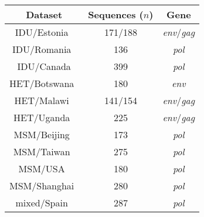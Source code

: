 \begin{tabular}{ccc}
  Dataset & Sequences ($n$) & Gene \\
  \hline
  IDU/Estonia~\autocite{zetterberg2004two} & 171/188 & \textit{env}/\textit{gag} \\
  IDU/Romania~\autocite{niculescu2015recent} & 136 & \textit{pol} \\
  IDU/Canada & 399 & \textit{pol} \\
  HET/Botswana~\autocite{novitsky2013phylogenetic,novitsky2014impact} & 180 & \textit{env} \\
  HET/Malawi~\autocite{mccormack2002early} & 141/154 & \textit{env}/\textit{gag} \\
  HET/Uganda~\autocite{grabowski2014role} & 225 & \textit{env}/\textit{gag} \\
  MSM/Beijing~\autocite{wang2015targeting} & 173 & \textit{pol} \\
  MSM/Taiwan~\autocite{kao2011surveillance} & 275 & \textit{pol} \\
  MSM/USA~\autocite{little2014using} & 180 & \textit{pol} \\
  MSM/Shanghai~\autocite{li2015hiv} & 280 & \textit{pol} \\
  mixed/Spain~\autocite{cuevas2009hiv} & 287 & \textit{pol} \\
  \hline
\end{tabular}
